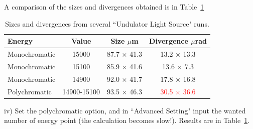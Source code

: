 A comparison of the sizes and divergences obtained is in Table~\ref{tab:full}

\begin{table}[H]
\centering
\caption{Sizes and divergences from several ``Undulator Light Source" runs.}
\begin{tabular}{lccc}
\hline
\textbf{Energy} & \textbf{Value} & \textbf{Size} $\mu$m& \textbf{Divergence} $\mu$rad\\
\hline
Monochromatic & 15000 & 87.7 $\times$ 41.3& 13.2 $\times$ 13.3 \\
Monochromatic & 15100 & 85.9 $\times$ 41.6& 13.6 $\times$ 7.3 \\
Monochromatic & 14900 & 92.0 $\times$ 41.7& 17.8 $\times$ 16.8 \\
\hline
Polychromatic & 14900-15100 & 93.5 $\times$ 46.3& \textcolor{red}{30.5 $\times$ 36.6} \\

\hline
\end{tabular}
\label{tab:full}
\end{table}

iv) Set the polychromatic option, and in ``Advanced Setting" input the wanted number of energy point (the calculation becomes slow!).
Results are in Table~\ref{tab:full}.


